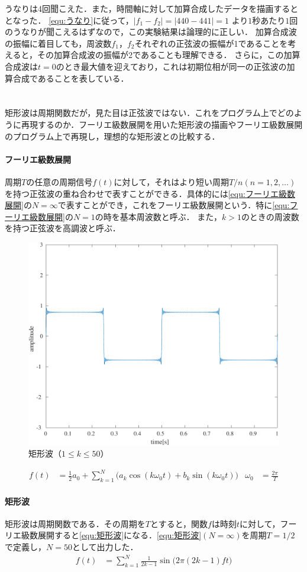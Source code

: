 \result
うなりは4回聞こえた．また，時間軸に対して加算合成したデータを描画するととなった．
\consideration \eqref{equ:うなり}に従って，\(\big|f_1-f_2\big|= \big|440-441\big|=1\)
より\(1\)秒あたり\(1\)回のうなりが聞こえるはずなので，この実験結果は論理的に正しい．
加算合成波の振幅に着目しても，周波数\(f_1\)，\(f_2\)それぞれの正弦波の振幅が1であることを考えると，その加算合成波の振幅が2であることも理解できる．
さらに，この加算合成波は\(t=0\)のとき最大値を迎えており，これは初期位相が同一の正弦波の加算合成であることを表している．
\section{\kadaiad}\label{sec:\kadaiad}
\purpose
矩形波は周期関数だが，見た目は正弦波ではない．これをプログラム上でどのように再現するのか．フーリエ級数展開を用いた矩形波の描画やフーリエ級数展開のプログラム上で再現し，理想的な矩形波との比較する．
\method
\paragraph{フーリエ級数展開}周期\(T\)の任意の周期信号\(f(t)\)に対して，それはより短い周期\(T/n(n=1,2,\dots)\)を持つ正弦波の重ね合わせで表すことができる．具体的には\eqref{equ:フーリエ級数展開}の\(N=\infty\)で表すことができ，これをフーリエ級数展開という．\cite[p.18-p.19]{信号処理}特に\eqref{equ:フーリエ級数展開}の\(N=1\)の時を基本周波数と呼ぶ．
また，\(k>1\)のときの周波数を持つ正弦波を高調波と呼ぶ．

\begin{figure}
    \includegraphics[keepaspectratio,width=.3\textwidth]{../../Figures/01_04_1.pdf}
    \caption{矩形波（\(1\leq k\leq 50\)）}
    \label{fig:矩形波}
\end{figure}
\begin{align}
    f(t) & =\frac{1}{2}a_0 + \sum_{k=1}^{N}\big(a_k\cos(k\omega_0t)+b_k\sin(k\omega_0t)\big) & \omega_0 & =\frac{2\pi}{T}\label{equ:フーリエ級数展開}
\end{align}
\paragraph{矩形波}
矩形波は周期関数である．その周期を\(T\)とすると，関数\(f\)は時刻\(t\)に対して，フーリエ級数展開すると\eqref{equ:矩形波}になる．\eqref{equ:矩形波}\((N=\infty)\)を周期\(T=1/2\)で定義し，\(N=50\)として出力した．
\begin{align}
    f(t) & =\sum_{k=1}^{N}\frac{1}{2k-1}\sin\big(2\pi(2k-1)ft\big)\label{equ:矩形波}
\end{align}
